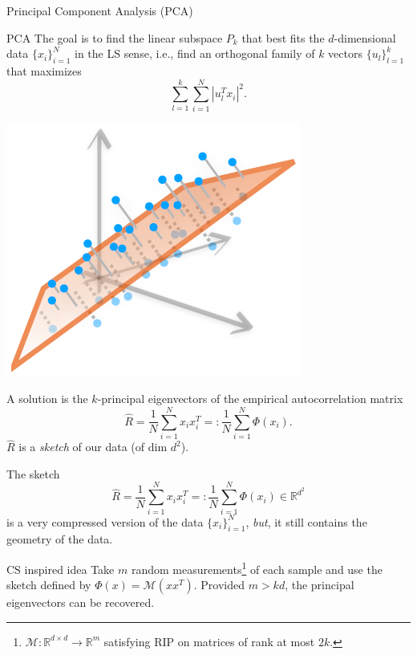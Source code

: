 \begin{frame}{Principal Component Analysis (PCA)}
	\begin{minipage}{0.59\textwidth}
		\begin{block}{PCA}
			The goal is to find the linear subspace $P_k$ that best fits the $d$-dimensional data $\{x_i\}_{i=1}^N$ in the LS sense, i.e., find an orthogonal family of $k$ vectors $\{u_l\}_{l=1}^k$ that maximizes
			\begin{equation*}
					\sum_{l=1}^k\sum_{i=1}^N |u_l^Tx_i|^2.
			\end{equation*}
		\end{block}
	\end{minipage}
	\begin{minipage}{0.4\textwidth}
	\includegraphics[width=\textwidth]{PCA_fig}
	\end{minipage}
	A solution is the $k$-principal eigenvectors of the empirical autocorrelation matrix
	\begin{equation*}
		\hat{R} = \frac{1}{N}\sum_{i=1}^N x_ix_i^T =: \frac{1}{N}\sum_{i=1}^N \Phi(x_i).
	\end{equation*}
	$\hat{R}$ is a \emph{sketch} of our data (of dim $d^2$).
\end{frame}


\begin{frame}
	The sketch 
	\begin{equation*}
		\hat{R} = \frac{1}{N}\sum_{i=1}^N x_ix_i^T =: \frac{1}{N}\sum_{i=1}^N \Phi(x_i) \in \mathbb{R}^{d^2}
	\end{equation*}
 	is a very compressed version of the data $\{x_i\}_{i=1}^N$, \emph{but}, it still contains the geometry of the data.
	\begin{block}{CS inspired idea}
		Take $m$ random measurements\footnote{$\mathcal{M}:\mathbb{R}^{d\times d}\to \mathbb{R}^m$ satisfying RIP on matrices of rank at most $2k$.} of each sample and use the sketch defined by $\Phi(x) = \mathcal{M}(xx^T)$. Provided $m>kd$, the principal eigenvectors can be recovered.
	\end{block}

\end{frame}